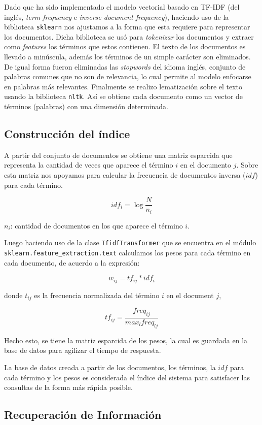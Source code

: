 \documentclass[12pt]{llncs}
\begin{document}
Dado que ha sido implementado el modelo vectorial basado en TF-IDF (del inglés, \textit{term frequency} e \textit{inverse document frequency}), haciendo uso de la biblioteca \verb+sklearn+ nos ajustamos a la forma que esta requiere para representar los documentos. Dicha biblioteca se usó para \textit{tokenizar} los documentos y extraer como \textit{features} los términos que estos contienen. El texto de los documentos es llevado a minúscula, además los términos de un simple carácter son eliminados. De igual forma fueron eliminadas las \textit{stopwords} del idioma inglés, conjunto de palabras comunes que no son de relevancia, lo cual permite al modelo enfocarse en palabras más relevantes. Finalmente se realizo lematización sobre el texto usando la biblioteca \verb+nltk+. Así se obtiene cada documento como un vector de términos (palabras) con una dimensión determinada.

\subsection{Construcción del índice}

A partir del conjunto de documentos se obtiene una matriz esparcida que representa la cantidad de veces que aparece el término $i$ en el documento $j$. Sobre esta matriz nos apoyamos para calcular la frecuencia de documentos inversa ($idf$) para cada término.

$$idf_i = \log \frac{N}{n_i}$$

$n_i$: cantidad de documentos en los que aparece el término $i$.

Luego haciendo uso de la clase \verb+TfidfTransformer+ que se encuentra en el módulo \verb+sklearn.feature_extraction.text+ calculamos los pesos para cada término en cada documento, de acuerdo a la expresión:

$$w_{ij} = tf_{ij} * idf_i$$

donde $t_{ij}$ es la frecuencia normalizada del término $i$ en el document $j$,

$$tf_{ij} = \frac{freq_{ij}}{max_l freq_{lj}}$$

Hecho esto, se tiene la matriz esparcida de los pesos, la cual es guardada en la base de datos para agilizar el tiempo de respuesta.

La base de datos creada a partir de los documentos, los términos, la $idf$ para cada término y los pesos es considerada el índice del sistema para satisfacer las consultas de la forma más rápida posible.

\subsection{Recuperación de Información}
\end{document}
